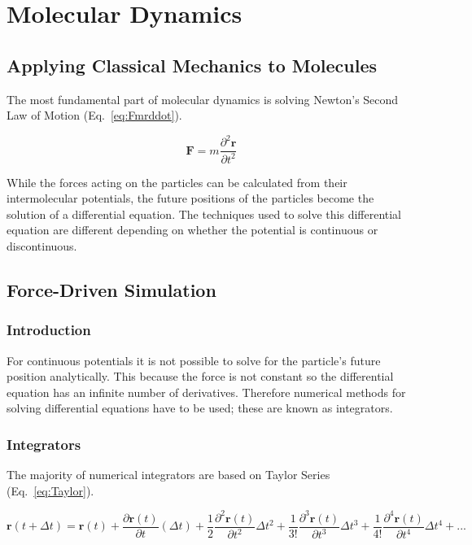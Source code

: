 \documentclass[12pt]{UoAthesis}
\begin{document}
\chapter{Molecular Dynamics}

\section{Applying Classical Mechanics to Molecules}

The most fundamental part of molecular dynamics is solving Newton's
Second Law of Motion (Eq.~\eqref{eq:Fmrddot}).

\begin{equation} 
  \mathbf{F} = m \frac{\partial^2 \mathbf{r}}{\partial t^2}
  \label{eq:Fmrddot} 
\end{equation}

While the forces acting on the particles can be calculated from their
intermolecular potentials, the future positions of the particles
become the solution of a differential equation.  The techniques used
to solve this differential equation are different depending on
whether the potential is continuous or discontinuous.

\section{Force-Driven Simulation}
\subsection{Introduction}
For continuous potentials it is not possible to solve for the
particle's future position analytically.  This because the force is
not constant so the differential equation has an infinite number of
derivatives.  Therefore numerical methods for solving differential
equations have to be used; these are known as integrators.

\subsection{Integrators} 

The majority of numerical integrators are based on Taylor Series
(Eq.~\ref{eq:Taylor}).

\begin{equation} 
\mathbf{r}(t+\Delta t) = \mathbf{r}(t) + 
\frac{\partial\mathbf{r}(t)}{\partial t}(\Delta t) + 
\frac{1}{2}\frac{\partial^2\mathbf{r}(t)}{\partial t^2}\Delta t^2 + 
\frac{1}{3!}\frac{\partial^3\mathbf{r}(t)}{\partial t^3}\Delta t^3 
+ \frac{1}{4!}\frac{\partial^4\mathbf{r}(t)}{\partial t^4}\Delta t^4 
+ ... \label{eq:Taylor} 
\end{equation}
\end{document}
